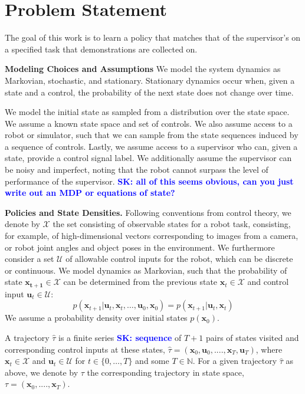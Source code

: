 \documentclass[10pt, conference]{ieeeconf}      %
\newcommand{\bu}{\mathbf{u}}
\newcommand{\bx}{\mathbf{x}}
\newcommand{\sknote}[1]{\ifthenelse{ \boolean{include-notes}}%
 {\textcolor{blue}{\textbf{SK: #1}}}{}}
\begin{document}
\section{Problem Statement}\label{sec:PS}
The goal of this work is to learn a policy that matches that of the supervisor's on a specified task that demonstrations are collected on. 

\noindent\textbf{Modeling Choices and Assumptions}  We model the system dynamics as Markovian, stochastic, and stationary. Stationary dynamics occur when, given a state and a control, the probability of the next state does not change over time. 

We model the initial state as sampled from a distribution over the state space.
We assume a known state space and set of controls. We also assume access to a robot or simulator, such that we  can sample from the state sequences induced by a sequence of controls.   Lastly, we assume access to a supervisor who can, given a state, provide a control signal label. We additionally assume the supervisor can be noisy and imperfect, noting that the robot cannot surpass the level of performance of the supervisor. 
\sknote{all of this seems obvious, can you just write out an MDP or equations of state?}


\noindent\textbf{Policies and State Densities.}
Following conventions from control theory, we denote by $\mathcal{X}$ the set consisting of observable states for a robot task, consisting, for example, of 
high-dimensional vectors corresponding to images from a camera, or robot joint angles and object poses in the environment.
We furthermore consider a set $\mathcal{U}$ of allowable control inputs for the robot, which can be discrete or
continuous. We model dynamics as Markovian, such that the probability of state $\mathbf{x_{t+1}}\in
\mathcal{X}$ can be determined from the previous state $\mathbf{x}_t\in\mathcal{X}$ and control input $\mathbf{u}_t\in
\mathcal{U}$: 
$$p(\bx_{t+1}|\bu_{t},\bx_{t}, \ldots, \bu_{0}, \bx_{0})=p(\bx_{t+1}|\bu_{t}, \bx_t)$$
We assume a probability density over initial states $p(\bx_0)$.



A trajectory $\hat{\tau}$ is a finite series\sknote{sequence} of $T+1$ pairs of states visited and corresponding
control inputs at these states, $\hat{\tau} = (\mathbf{x}_0,\mathbf{u}_0, ...., \mathbf{x}_T,\mathbf{u}_T)$, where $\bx_t\in \mathcal{X}$
and $\bu_t\in \mathcal{U}$ for $t\in \{0, \ldots, T\}$ and some $T\in \mathbb{N}$.  
For a given trajectory $\hat{\tau}$ as above, we denote by ${\tau}$ the corresponding trajectory in state space,
${\tau} = (\bx_0,....,\bx_T)$.
\end{document}
